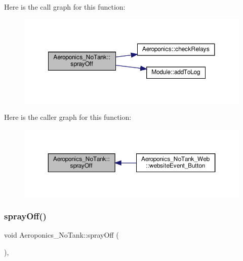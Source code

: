 Here is the call graph for this function\+:
\nopagebreak
\begin{figure}[H]
\begin{center}
\leavevmode
\includegraphics[width=350pt]{class_aeroponics___no_tank_a37537625cd3d80d6c49adeae298d4a76_cgraph}
\end{center}
\end{figure}
Here is the caller graph for this function\+:
\nopagebreak
\begin{figure}[H]
\begin{center}
\leavevmode
\includegraphics[width=350pt]{class_aeroponics___no_tank_a37537625cd3d80d6c49adeae298d4a76_icgraph}
\end{center}
\end{figure}
\mbox{\label{class_aeroponics___no_tank_a37537625cd3d80d6c49adeae298d4a76}} 
\subsubsection{\texorpdfstring{spray\+Off()}{sprayOff()}\hspace{0.1cm}{\footnotesize\ttfamily [2/2]}}
{\footnotesize\ttfamily void Aeroponics\+\_\+\+No\+Tank\+::spray\+Off (\begin{DoxyParamCaption}{ }\end{DoxyParamCaption})\hspace{0.3cm}{\ttfamily [protected]}, {\ttfamily [virtual]}}



